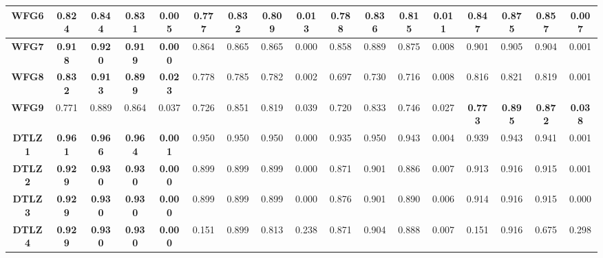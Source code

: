\begin{table*}[t]
{\begin{tabular}{cc|c|c|c|c|c|c|c|c|c|c|c|c|c|c|c}
\multicolumn{1}{c|}{\textbf{WFG6}}  & 0.824          & 0.844          & 0.831          & 0.005          & 0.777          & 0.832          & 0.809          & 0.013          & 0.788        & 0.836        & 0.815         & 0.011        & \textbf{0.847} & \textbf{0.875} & \textbf{0.857} & \textbf{0.007}  \\ \hline
\multicolumn{1}{c|}{\textbf{WFG7}}  & \textbf{0.918} & \textbf{0.920} & \textbf{0.919} & \textbf{0.000} & 0.864          & 0.865          & 0.865          & 0.000          & 0.858        & 0.889        & 0.875         & 0.008        & 0.901          & 0.905          & 0.904          & 0.001           \\ \hline
\multicolumn{1}{c|}{\textbf{WFG8}}  & \textbf{0.832} & \textbf{0.913} & \textbf{0.899} & \textbf{0.023} & 0.778          & 0.785          & 0.782          & 0.002          & 0.697        & 0.730        & 0.716         & 0.008        & 0.816          & 0.821          & 0.819          & 0.001           \\ \hline
\multicolumn{1}{c|}{\textbf{WFG9}}  & 0.771          & 0.889          & 0.864          & 0.037          & 0.726          & 0.851          & 0.819          & 0.039          & 0.720        & 0.833        & 0.746         & 0.027        & \textbf{0.773} & \textbf{0.895} & \textbf{0.872} & \textbf{0.038}  \\ \hline
\multicolumn{1}{c|}{\textbf{DTLZ1}} & \textbf{0.961} & \textbf{0.966} & \textbf{0.964} & \textbf{0.001} & 0.950          & 0.950          & 0.950          & 0.000          & 0.935        & 0.950        & 0.943         & 0.004        & 0.939          & 0.943          & 0.941          & 0.001           \\ \hline
\multicolumn{1}{c|}{\textbf{DTLZ2}} & \textbf{0.929} & \textbf{0.930} & \textbf{0.930} & \textbf{0.000} & 0.899          & 0.899          & 0.899          & 0.000          & 0.871        & 0.901        & 0.886         & 0.007        & 0.913          & 0.916          & 0.915          & 0.001           \\ \hline
\multicolumn{1}{c|}{\textbf{DTLZ3}} & \textbf{0.929} & \textbf{0.930} & \textbf{0.930} & \textbf{0.000} & 0.899          & 0.899          & 0.899          & 0.000          & 0.876        & 0.901        & 0.890         & 0.006        & 0.914          & 0.916          & 0.915          & 0.000           \\ \hline
\multicolumn{1}{c|}{\textbf{DTLZ4}} & \textbf{0.929} & \textbf{0.930} & \textbf{0.930} & \textbf{0.000} & 0.151          & 0.899          & 0.813          & 0.238          & 0.871        & 0.904        & 0.888         & 0.007        & 0.151          & 0.916          & 0.675          & 0.298           \\ \hline

\end{tabular}}
\end{table*}
